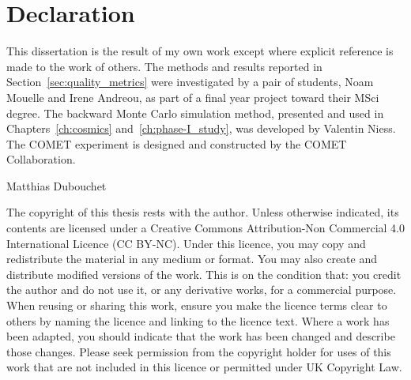 
\chapter*{Declaration}
This dissertation is the result of my own work except where explicit reference
is made to the work of others. 
The methods and results reported in Section~\ref{sec:quality_metrics} were
investigated by a pair of students, Noam Mouelle and Irene Andreou, as part of a
final year project toward their MSci degree. The backward Monte Carlo simulation
method, presented and used in Chapters~\ref{ch:cosmics}
and~\ref{ch:phase-I_study}, was developed by Valentin Niess. The COMET
experiment is designed and constructed by the COMET Collaboration.

\hfill Matthias Dubouchet

\vspace{2cm}
The copyright of this thesis rests with the author. Unless otherwise indicated, 
its contents are licensed under a Creative Commons Attribution-Non 
Commercial 4.0 International Licence (CC BY-NC). 
Under this licence, you may copy and redistribute the material in any medium 
or format. You may also create and distribute modified versions of the work. 
This is on the condition that: you credit the author and do not use it, or any 
derivative works, for a commercial purpose. 
When reusing or sharing this work, ensure you make the licence terms clear to 
others by naming the licence and linking to the licence text. Where a work has 
been adapted, you should indicate that the work has been changed and 
describe those changes. 
Please seek permission from the copyright holder for uses of this work that are 
not included in this licence or permitted under UK Copyright Law.